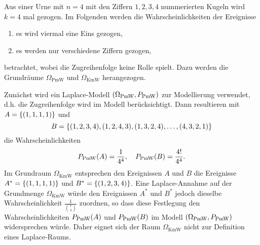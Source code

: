 \documentclass{lecture}
\begin{document}
    \begin{example}
        Aus einer Urne mit \(n = 4\) mit den Ziffern \(1, 2, 3, 4\) nummerierten Kugeln wird \(k = 4\) mal gezogen.
        Im Folgenden werden die Wahrscheinlichkeiten der Ereignisse
        \begin{enumerate}
            \item es wird viermal eine Eins gezogen,
            \item es werden nur verschiedene Ziffern gezogen,
        \end{enumerate}
        betrachtet, wobei die Zugreihenfolge keine Rolle spielt.
        Dazu werden die Grundräume \(\Omega_{\text{PmW}}\) und \(\Omega_{\text{KmW}}\) herangezogen.

        Zunächst wird ein Laplace-Modell \(\parentheses*{\Omega_{\text{PmW}}, P_{\text{PmW}}}\) zur Modellierung verwendet, d.h. die Zugreihenfolge wird im Modell berücksichtigt.
        Dann resultieren mit \(A = \braces*{\parentheses*{1, 1, 1, 1}}\) und
        \[
            B = \braces*{\parentheses*{1, 2, 3, 4}, \parentheses*{1, 2, 4, 3}, \parentheses*{1, 3, 2, 4}, \ldots, \parentheses*{4, 3, 2, 1}}
        \]
        die Wahrscheinlichkeiten
        \[
            P_{\text{PmW}}\parentheses*{A} = \frac{1}{4^4}, \quad P_{\text{PmW}}\parentheses*{B} = \frac{4!}{4^4}.
        \]
        Im Grundraum \(\Omega_{\text{KmW}}\) entsprechen den Ereignissen \(A\) und \(B\) die Ereignisse \(A^* = \braces*{\parentheses*{1, 1, 1, 1}}\) und \(B^* = \braces*{\parentheses*{1, 2, 3, 4}}\).
        Eine Laplace-Annahme auf der Grundmenge \(\Omega_{\text{KmW}}\) würde den Ereignissen \(A^*\) und \(B^*\) jedoch dieselbe Wahrscheinlichkeit \(\frac{1}{\binom{7}{4}}\) zuordnen, so dass diese Festlegung den Wahrscheinlichkeiten \(P_{\text{PmW}}\parentheses*{A}\) und \(P_{\text{PmW}}\parentheses*{B}\) im Modell \(\parentheses*{\Omega_{\text{PmW}}, P_{\text{PmW}}}\) widersprechen würde.
        Daher eignet sich der Raum \(\Omega_{\text{KmW}}\) nicht zur Definition eines Laplace-Raums.
    \end{example}
\end{document}
